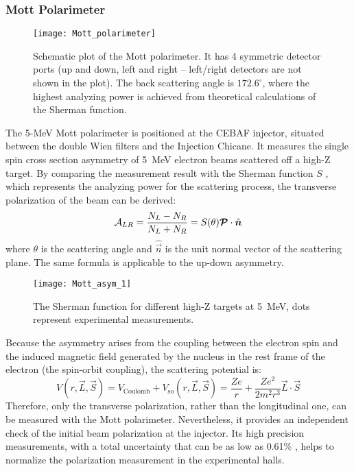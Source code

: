 \subsubsection{Mott Polarimeter}
\begin{figure}[!h]
    \centering
    \texttt{[image: Mott\_polarimeter]}
    \caption[Mott polarimeter]
    {Schematic plot of the Mott polarimeter. It has 4 symmetric detector
    ports (up and down, left and right -- left/right detectors are not shown in the plot). 
    The back scattering angle is $172.6^\circ$, where the highest analyzing power 
    is achieved from theoretical calculations of the Sherman function.
    \cite{PhysRevC.102.015501}}
\end{figure}
The 5-MeV Mott polarimeter is positioned at the CEBAF injector, situated between 
the double Wien filters and the Injection Chicane. It measures the single spin cross section asymmetry
of 5~MeV electron beams scattered off a high-Z target. By comparing the measurement
result with the Sherman function $S$ \cite{PhysRev.103.1601}, which represents the analyzing power for the scattering process,  
the transverse polarization of the beam can be derived:
\begin{equation}
    \mathcal{A}_{LR} = \frac{N_L - N_R}{N_L + N_R} = S(\theta)\boldsymbol{\mathcal{P}}\cdot \hat{\boldsymbol{n}}
\end{equation}
where $\theta$ is the scattering angle and $\hat{\vec{n}}$ is the unit normal 
vector of the scattering plane. The same formula is applicable to the up-down asymmetry.
\begin{figure}
    \centering
    \texttt{[image: Mott\_asym\_1]}
    \caption[Sherman function]
    {The Sherman function for different high-Z targets at 5~MeV, dots
    represent experimental measurements.}   %
\end{figure}
Because the asymmetry arises from the coupling between the electron spin and the induced
magnetic field generated by the nucleus in the rest frame of the electron (the spin-orbit coupling), 
the scattering potential is:
\begin{equation}
    V(r, \vec{L}, \vec{S}) = V_{\text{Coulomb}} + V_{\text{so}} (r, \vec{L}, \vec{S}) 
    = \frac{Ze}{r} + \frac{Ze^2}{2m^2r^3}\vec{L}\cdot \vec{S}
\end{equation}
Therefore, only the transverse polarization, rather than the longitudinal one, can be 
measured with the Mott polarimeter. Nevertheless, it provides an
independent check of the initial beam polarization at the injector. Its high
precision measurements, with a total uncertainty that can be as low as 0.61\% \cite{PhysRevC.102.015501},
helps to normalize the polarization measurement in the experimental halls.

